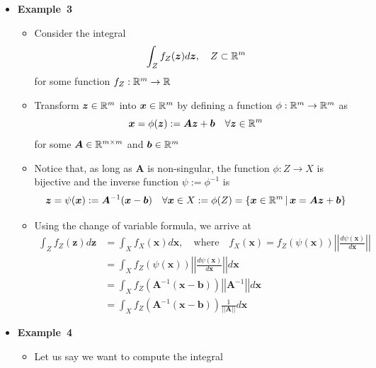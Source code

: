 \documentclass[12pt,a4paper]{article}
\begin{document}
\begin{itemize}
\item \textbf{Example~3}

  \begin{itemize}
  \item Consider the integral
    \begin{equation}\nonumber%
      \int_{Z}f_{Z}(\bm{z})d\bm{z},
      \quad
      Z \subset \R^{m}
    \end{equation}
    for some function $f_{Z}:\mathbb{R}^{m}\to \mathbb{R}$
  \item Transform $\bm{z}\in \mathbb{R}^{m}$ into $\bm{x}\in \mathbb{R}^{m}$ by defining a function $\phi:\mathbb{R}^{m} \to \mathbb{R}^{m}$ as
    \begin{equation}\nonumber%
      \bm{x} = \phi(\bm{z}) := \bm{A}\bm{z} + \bm{b}
      \quad \forall \bm{z}\in \R^{m}
    \end{equation}
    for some $\bm{A}\in \mathbb{R}^{m\times m}$ and $\bm{b}\in \mathbb{R}^{m}$
  \item Notice that, as long as $\bm{A}$ is non-singular,
    the function $\phi: Z \to X$ is bijective
    and the inverse function $\psi:=\phi^{-1}$ is
    \begin{equation}\nonumber%
      \bm{z}
      = \psi(\bm{x})
      := \bm{A}^{-1}(\bm{x}-\bm{b})
      \quad \forall \bm{x} \in X:= \phi(Z) = \left\{ \bm{x}\in \R^{m} \,|\, \bm{x}=\bm{A}\bm{z} + \bm{b}\right\}
    \end{equation}
  \item Using the change of variable formula, we arrive at
    \begin{align}
      \int_{Z}f_{Z}(\bm{z})d\bm{z}
      & = \int_{X}f_{X}(\bm{x})d\bm{x}, \quad \text{where}\quad
        f_{X}(\bm{x}) = f_{Z}(\psi(\bm{x})) \left|\left| \frac{d\psi(\bm{x})}{d\bm{x}}\right|\right|
        \nonumber \\
      & = \int_{X}f_{Z}(\psi(\bm{x})) \left|\left| \frac{d\psi(\bm{x})}{d\bm{x}}\right|\right| d\bm{x} \nonumber \\
      & = \int_{X}f_{Z}(\bm{A}^{-1}(\bm{x}-\bm{b}))\left|\left|\bm{A}^{-1}\right|\right| d\bm{x} \nonumber \\
      & = \int_{X}f_{Z}(\bm{A}^{-1}(\bm{x}-\bm{b}))\frac{1}{||\bm{A}||}d\bm{x}
    \nonumber%
    \end{align}
  \end{itemize}
\item \textbf{Example~4}
  \begin{itemize}
  \item Let us say we want to compute the integral

\end{itemize}
\end{itemize}
\end{document}
